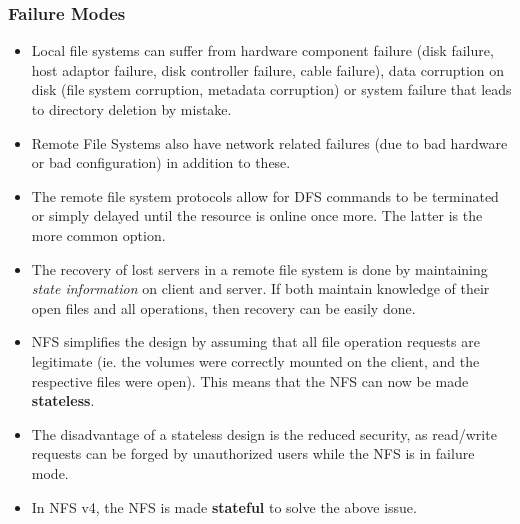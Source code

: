 \documentclass{article}
\theoremstyle{plain}
\theoremstyle{definition}
\begin{document}
\subsubsection{Failure Modes}
\begin{itemize}
    \item Local file systems can suffer from hardware component failure (disk failure, host adaptor failure, disk controller failure, cable failure), data corruption on disk (file system corruption, metadata corruption) or system failure that leads to directory deletion by mistake.
    
    \item Remote File Systems also have network related failures (due to bad hardware or bad configuration) in addition to these.
    
    \item The remote file system protocols allow for DFS commands to be terminated or simply delayed until the resource is online once more. The latter is the more common option.
    
    \item The recovery of lost servers in a remote file system is done by maintaining \textit{state information} on client and server. If both maintain knowledge of their open files and all operations, then recovery can be easily done. 
    
    \item NFS simplifies the design by assuming that all file operation requests are legitimate (ie. the volumes were correctly mounted on the client, and the respective files were open). This means that the NFS can now be made \textbf{stateless}.
    
    \item The disadvantage of a stateless design is the reduced security, as read/write requests can be forged by unauthorized users while the NFS is in failure mode. 
    
    \item In NFS v4, the NFS is made \textbf{stateful} to solve the above issue.
\end{itemize}
\end{document}
